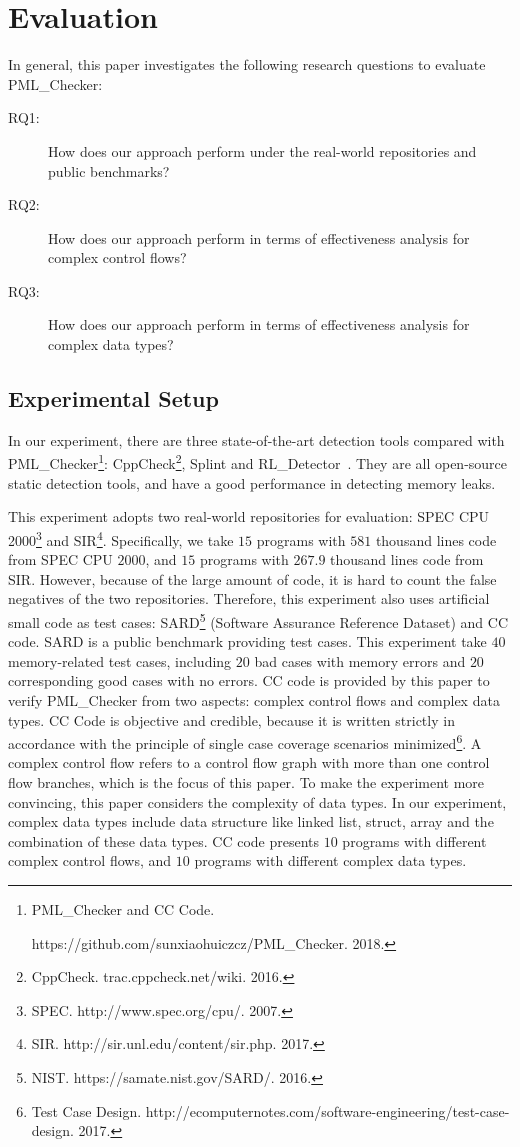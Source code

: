 \section{Evaluation}\label{sec:evaluation}

In general, this paper investigates the following research questions to evaluate PML\_Checker:
\begin{description}
\item[RQ1:] How does our approach perform under the real-world repositories and public benchmarks? 
\item[RQ2:] How does our approach perform in terms of effectiveness analysis for complex control flows? 
\item[RQ3:] How does our approach perform in terms of effectiveness analysis for complex data types? 
\end{description}

\subsection{Experimental Setup}

In our experiment, there are three state-of-the-art detection tools compared with PML\_Checker\footnote{PML\_Checker and CC Code. \par https://github.com/sunxiaohuiczcz/PML\_Checker. 2018.}: CppCheck\footnote{CppCheck. trac.cppcheck.net/wiki. 2016.}, Splint\cite{DD02} and RL\_Detector~\cite{J14}. They are all open-source static detection tools, and have a good performance in detecting memory leaks.

This experiment adopts two real-world repositories for evaluation: SPEC CPU 2000\footnote{SPEC. http://www.spec.org/cpu/. 2007.} and SIR\footnote{SIR. http://sir.unl.edu/content/sir.php. 2017.}. Specifically, we take $15$ programs with $581$ thousand lines code from SPEC CPU $2000$, and  $15$ programs with $267.9$ thousand lines code from SIR. 
However, because of the large amount of code, it is hard to count the false negatives of the two repositories. Therefore, this experiment also uses artificial small code as test cases: SARD\footnote{NIST. https://samate.nist.gov/SARD/. 2016.} (Software Assurance Reference Dataset) and CC code. SARD is a public benchmark providing test cases. This experiment take $40$ memory-related test cases, including $20$ bad cases with memory errors and $20$ corresponding good cases with no errors. CC code is provided by this paper to verify PML\_Checker from two aspects: complex control flows and complex data types. CC Code is objective and credible, because it is written strictly in accordance with the principle of single case coverage scenarios minimized\footnote{Test Case Design. http://ecomputernotes.com/software-engineering/test-case-design. 2017.}.
A complex control flow refers to a control flow graph with more than one control flow branches, which is the focus of this paper. To make the experiment more convincing, this paper considers the complexity of data types. In our experiment, complex data types include data structure like linked list, struct, array and the combination of these data types. CC code presents $10$ programs with different complex control flows, and $10$ programs with different complex data types.


